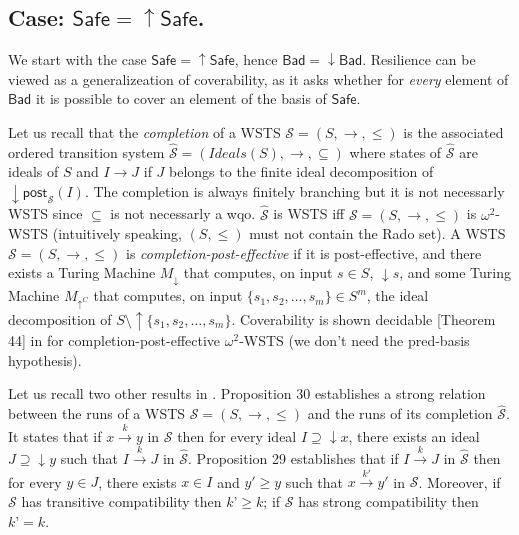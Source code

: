 \documentclass[runningheads]{llncs}
\newcommand{\post}{\textsf{post}}
\newcommand{\Bad}{\textsf{Bad}}
\newcommand{\Safe}{\textsf{Safe}}
\begin{document}
\subsection{Case: $\Safe=\uparrow \Safe$.}\label{safe-up}

We start with the case $\Safe=\uparrow \Safe$, hence $\Bad=\downarrow \Bad$. 
Resilience can be viewed as a generalizeation
 of coverability, as
it asks whether for \emph{every} element of $\Bad$ it is possible to cover an element of the basis of $\Safe$.


Let us recall that the \emph{completion}  \cite{BFM-ic17} of a WSTS $\mathscr{S}=(S,\rightarrow, \leq)$ is the associated ordered transition system $\hat{\mathscr{S}}=(Ideals(S),\rightarrow, \subseteq)$ where states of $\hat{\mathscr{S}}$ are ideals of $S$ and $I \rightarrow J$ if $J$ belongs to the finite ideal decomposition of $\downarrow \post_{\mathscr{S}}(I)$. The completion is always finitely branching but it is not necessarly WSTS since $\subseteq$ is not necessarly a wqo. $\hat{\mathscr{S}}$ is WSTS iff $\mathscr{S}=(S,\rightarrow, \leq)$ is $\omega^2$-WSTS (intuitively speaking, $(S,\leq)$ must not contain the Rado set). 
A WSTS $\mathscr{S}=(S,\rightarrow,\leq)$ is {\em completion-post-effective} if
it is post-effective, and there exists a Turing Machine $M_\downarrow$ that computes, on input $s \in S$, 
 $\downarrow s$, and some Turing Machine $M_{\uparrow^C}$ that computes, on input
 $\{s_1, s_2, \ldots, s_m\} \in S^m$, 
 the ideal decomposition of $S \setminus \uparrow \{ s_1, s_2, \ldots, s_m\}$.
Coverability is shown decidable  [Theorem 44] in \cite{BFM-ic17} for completion-post-effective $\omega^2$-WSTS (we don't need the pred-basis hypothesis).

Let us recall two other results in \cite{BFM-ic17}. Proposition 30 establishes a strong relation between the runs of a WSTS $\mathscr{S}=(S,\rightarrow, \leq)$ and the runs of its completion $\hat{\mathscr{S}}$. It states that if $x \xrightarrow{k} y$ in $\mathscr{S}$ then for every ideal $I \supseteq \downarrow x$, there exists an ideal $J \supseteq \downarrow y$ such that $I \xrightarrow{k} J$ in $\hat{\mathscr{S}}$. Proposition 29 establishes that if $I \xrightarrow{k} J$ in $\hat{\mathscr{S}}$ then for every $y \in J$, there exists $x \in I$ and $y' \geq y$ such that $x \xrightarrow{k'} y'$ in $\mathscr{S}$. Moreover, if $\mathscr{S}$ has transitive compatibility then $k’ \geq k$; if $\mathscr{S}$ has strong compatibility then $k’ = k$.
%
\end{document}
